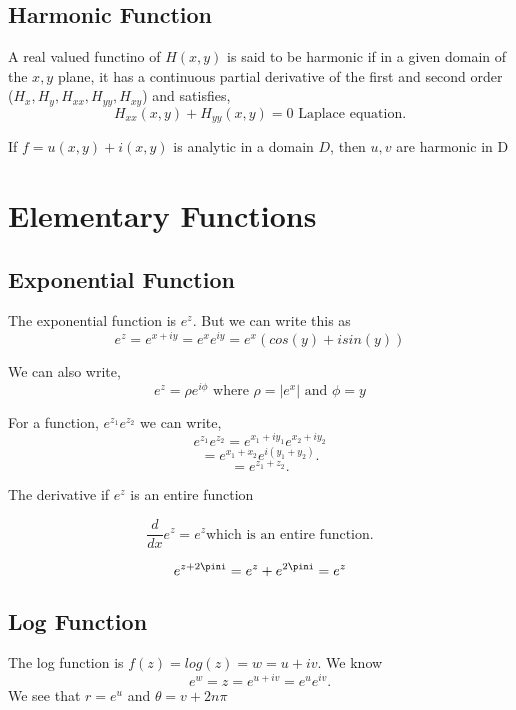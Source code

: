 \section{Harmonic Function}

\begin{definition}
   A real valued functino of $H(x,y)$ is said to be harmonic if in a given domain of the $x,y$ plane, it has a continuous partial derivative of the first and second order ($H_x,H_y,H_{xx},H_{yy},H_{xy}$) and satisfies,  \[
      H_{xx}(x,y)  + H_{yy}(x,y) = 0 \text{ Laplace equation}
   .\] 

\end{definition}     


\begin{theorem}
   If $f = u(x,y) + i(x,y)$ is analytic in a domain $D$, then $u,v$ are harmonic in D
\end{theorem}




\chapter{Elementary Functions}
\section{Exponential Function}
The exponential function is $e^z$. But we can write this as 
$$e^z = e^{x + iy} = e^x e^{iy} = e^x(cos(y) + isin(y))$$

We can also write, $$e^z = \rho e^{i \phi} \text{ where } \rho = |e^x| \text{ and } \phi = y$$ 

For a function, $e^{z_1}e^{z_2}$ we can write, 
$$e^{z_1}e^{z_2} = e^{x_1 + iy_1}e^{x_2+iy_2}$$
\[
=e^{x_1 + x_2} e^{i(y_1+y_2)}
.\] 
\[
   =e^{z_1+z_2}
.\] 



The derivative if $e^z$ is an entire function

$$\frac{d}{dx} e^z = e^z \text{which is an entire function.}$$

$$e^{z + 2\pini} = e^z + e^{2\pini} = e^z$$

\section{Log Function}
The log function is $f(z) = log(z) = w = u + iv$. We know \[
   e^w = z = e^{u + iv} = e^u e^{iv}
.\] 
We see that $r = e^u$ and $\theta = v + 2n\pi$

